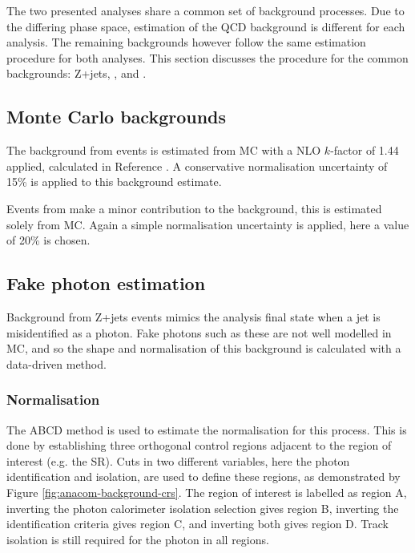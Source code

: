 \newcommand\nxzj[2]{\ensuremath{N_{#1,\text{#2}}^\text{Z+jets}}}

The two presented analyses share a common set of background processes. Due to
the differing phase space, estimation of the \ac{QCD} \Zy background is
different for each analysis. The remaining backgrounds however follow the same
estimation procedure for both analyses. This section discusses the procedure for
the common backgrounds: Z+jets, \tty, and \WZjj.

\subsection{Monte Carlo backgrounds}

The background from \tty events is estimated from \ac{MC} with a \ac{NLO}
$k$-factor of 1.44 applied, calculated in Reference \cite{ATLAStty2019}.
A conservative normalisation uncertainty of 15\% is applied to this background
estimate.

Events from \WZjj make a minor contribution to the background, this is
estimated solely from \ac{MC}. Again a simple normalisation uncertainty is
applied, here a value of 20\% is chosen.

\subsection{Fake photon estimation}
\label{sec:methods-backgrounds-fakephoton}

Background from Z+jets events mimics the analysis final state when a jet is
misidentified as a photon. Fake photons such as these are not well modelled in
\ac{MC}, and so the shape and normalisation of this background is
calculated with a data-driven method.

\subsubsection{Normalisation}

The ABCD method is used to estimate the normalisation for this process. This is
done by establishing three orthogonal control regions adjacent to the region of
interest (e.g. the \ac{SR}). Cuts in two different variables, here the photon
identification and isolation, are used to define these regions, as demonstrated
by Figure \ref{fig:anacom-background-crs}.  The region of interest is labelled
as region A, inverting the photon calorimeter isolation selection gives region
B, inverting the identification criteria gives region C, and inverting both
gives region D.  Track isolation is still required for the photon in all
regions.

